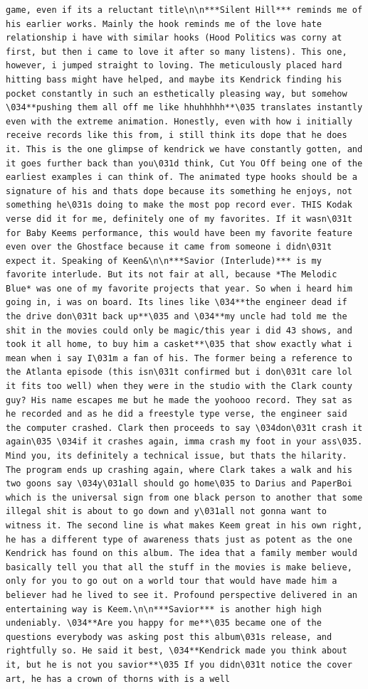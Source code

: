 \documentclass[
  letterpaper,
  DIV=11,
  numbers=noendperiod]{scrreprt}
\begin{document}
\begin{verbatim}
game, even if its a reluctant title\n\n***Silent Hill*** reminds me of his earlier works. Mainly the hook reminds me of the love hate relationship i have with similar hooks (Hood Politics was corny at first, but then i came to love it after so many listens). This one, however, i jumped straight to loving. The meticulously placed hard hitting bass might have helped, and maybe its Kendrick finding his pocket constantly in such an esthetically pleasing way, but somehow \034**pushing them all off me like hhuhhhhh**\035 translates instantly even with the extreme animation. Honestly, even with how i initially receive records like this from, i still think its dope that he does it. This is the one glimpse of kendrick we have constantly gotten, and it goes further back than you\031d think, Cut You Off being one of the earliest examples i can think of. The animated type hooks should be a signature of his and thats dope because its something he enjoys, not something he\031s doing to make the most pop record ever. THIS Kodak verse did it for me, definitely one of my favorites. If it wasn\031t for Baby Keems performance, this would have been my favorite feature even over the Ghostface because it came from someone i didn\031t expect it. Speaking of Keen&\n\n***Savior (Interlude)*** is my favorite interlude. But its not fair at all, because *The Melodic Blue* was one of my favorite projects that year. So when i heard him going in, i was on board. Its lines like \034**the engineer dead if the drive don\031t back up**\035 and \034**my uncle had told me the shit in the movies could only be magic/this year i did 43 shows, and took it all home, to buy him a casket**\035 that show exactly what i mean when i say I\031m a fan of his. The former being a reference to the Atlanta episode (this isn\031t confirmed but i don\031t care lol it fits too well) when they were in the studio with the Clark county guy? His name escapes me but he made the yoohooo record. They sat as he recorded and as he did a freestyle type verse, the engineer said the computer crashed. Clark then proceeds to say \034don\031t crash it again\035 \034if it crashes again, imma crash my foot in your ass\035. Mind you, its definitely a technical issue, but thats the hilarity. The program ends up crashing again, where Clark takes a walk and his two goons say \034y\031all should go home\035 to Darius and PaperBoi which is the universal sign from one black person to another that some illegal shit is about to go down and y\031all not gonna want to witness it. The second line is what makes Keem great in his own right, he has a different type of awareness thats just as potent as the one Kendrick has found on this album. The idea that a family member would basically tell you that all the stuff in the movies is make believe, only for you to go out on a world tour that would have made him a believer had he lived to see it. Profound perspective delivered in an entertaining way is Keem.\n\n***Savior*** is another high high undeniably. \034**Are you happy for me**\035 became one of the questions everybody was asking post this album\031s release, and rightfully so. He said it best, \034**Kendrick made you think about it, but he is not you savior**\035 If you didn\031t notice the cover art, he has a crown of thorns with is a well 
\end{verbatim}
\end{document}
